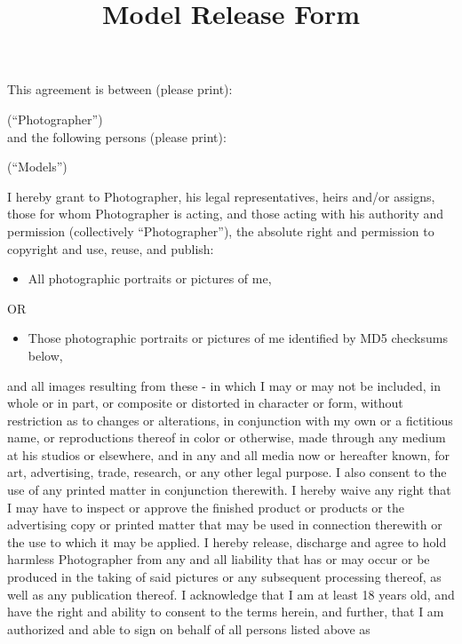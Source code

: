 \documentclass[a4paper,romanian,english]{article}
\begin{document}
\title{Model Release Form}
\renewcommand{\today}{}
\maketitle{}
\vspace{-0.8cm}

This agreement is between (please print):

\textcolor{lg}{(“Photographer”)}\\

and the following persons (please print):

\textcolor{lg}{(“Models”)}

\vspace{0.3cm}
I hereby grant to Photographer, his legal representatives, heirs and/or assigns, those for whom Photographer is acting, and those acting with his authority and permission (collectively “Photographer”),
the absolute right and permission to copyright and use, reuse, and publish:
\begin{itemize}
\renewcommand{\labelitemi}{$\Box$}
	\item All photographic portraits or pictures of me,
\end{itemize}
OR
\begin{itemize}
\renewcommand{\labelitemi}{$\Box$}
	\item Those photographic portraits or pictures of me identified by MD5 checksums below,
\end{itemize}
\noindent and all images resulting from these - in which I may or may not be included, in whole or in part, or composite or distorted in character or form, without restriction as to changes or alterations, 
in conjunction with my own or a fictitious name, or reproductions thereof in color or otherwise, made through any medium at his studios or elsewhere, and in any and all media now or hereafter known,
for art, advertising, trade, research, or any other legal purpose. 
I also consent to the use of any printed matter in conjunction therewith.
I hereby waive any right that I may have to inspect or approve the finished product or products or the advertising copy or printed matter that may be used in connection therewith or the use to which it may be applied.
I hereby release, discharge and agree to hold harmless Photographer from any and all liability that has or may occur or be produced in the taking of said pictures or any subsequent processing thereof, as well as any publication thereof.
I acknowledge that I am at least 18 years old, and have the right and ability to consent to the terms herein, and further, that I am authorized and able to sign on behalf of all persons listed above as
\end{document}

